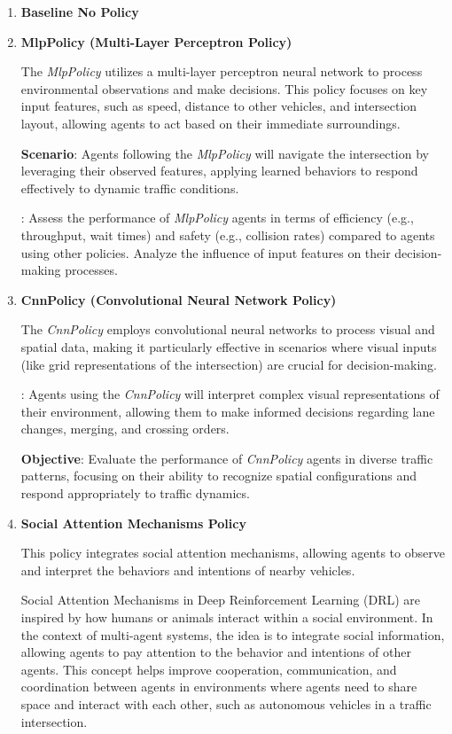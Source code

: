 \begin{enumerate}
    \item\textbf{Baseline {No Policy}}

    \item\textbf{MlpPolicy (Multi-Layer Perceptron Policy)}
    
    The \textit{MlpPolicy} utilizes a multi-layer perceptron neural network to process environmental observations and make decisions. This policy focuses on key input features, such as speed, distance to other vehicles, and intersection layout, allowing agents to act based on their immediate surroundings.

    \textbf{Scenario}: Agents following the \textit{MlpPolicy} will navigate the intersection by leveraging their observed features, applying learned behaviors to respond effectively to dynamic traffic conditions.

    : Assess the performance of \textit{MlpPolicy} agents in terms of efficiency (e.g., throughput, wait times) and safety (e.g., collision rates) compared to agents using other policies. Analyze the influence of input features on their decision-making processes.

    \item\textbf{CnnPolicy (Convolutional Neural Network Policy)}
    
    The \textit{CnnPolicy} employs convolutional neural networks to process visual and spatial data, making it particularly effective in scenarios where visual inputs (like grid representations of the intersection) are crucial for decision-making.

    : Agents using the \textit{CnnPolicy} will interpret complex visual representations of their environment, allowing them to make informed decisions regarding lane changes, merging, and crossing orders.

    \textbf{Objective}: Evaluate the performance of \textit{CnnPolicy} agents in diverse traffic patterns, focusing on their ability to recognize spatial configurations and respond appropriately to traffic dynamics.

    \item\textbf{Social Attention Mechanisms Policy}
    
    This policy integrates social attention mechanisms, allowing agents to observe and interpret the behaviors and intentions of nearby vehicles. 

Social Attention Mechanisms in Deep Reinforcement Learning (DRL) are inspired by how humans or animals interact within a social environment.
In the context of multi-agent systems, the idea is to integrate social information, allowing agents to pay attention to the behavior and 
intentions of other agents.\cite{sutton2018reinforcement}
This concept helps improve cooperation, communication, and coordination between agents in environments where agents need to share space and interact with each other, such as autonomous vehicles in a traffic intersection.



\end{enumerate}

